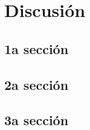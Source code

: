 \chapter{Discusión} \label{Inf} 
 
\lipsum[1-2] %

\section{1a sección}
\lipsum[1-2] %

\section{2a sección}
\lipsum[1-2] %

\section{3a sección}
\lipsum[1-2] %
